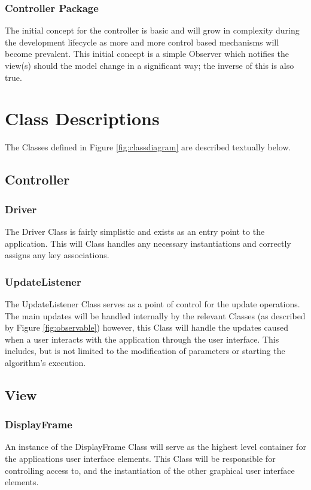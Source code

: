 \subsubsection{Controller Package}
\label{sssec:cntrl}
The initial concept for the controller is basic and will grow in complexity during the development lifecycle as more and more control based mechanisms will become prevalent. This initial concept is a simple Observer which notifies the view(s) should the model change in a significant way; the inverse of this is also true.

\section{Class Descriptions}

The Classes defined in Figure \ref{fig:classdiagram} are described textually below.

\subsection{Controller}

\subsubsection{Driver}
\label{driver:classdef}
The Driver Class is fairly simplistic and exists as an entry point to the application. This will Class handles any necessary instantiations and correctly assigns any key associations.
\subsubsection{UpdateListener}
The UpdateListener Class serves as a point of control for the update operations. The main updates will be handled internally by the relevant Classes (as described by Figure \ref{fig:observable}) however, this Class will handle the updates caused when a user interacts with the application through the user interface. This includes, but is not limited to the modification of parameters or starting the algorithm's execution.

\subsection{View}
\subsubsection{DisplayFrame}
An instance of the DisplayFrame Class will serve as the highest level container for the applications user interface elements. This Class will be responsible for controlling access to, and the instantiation of the other graphical user interface elements.
